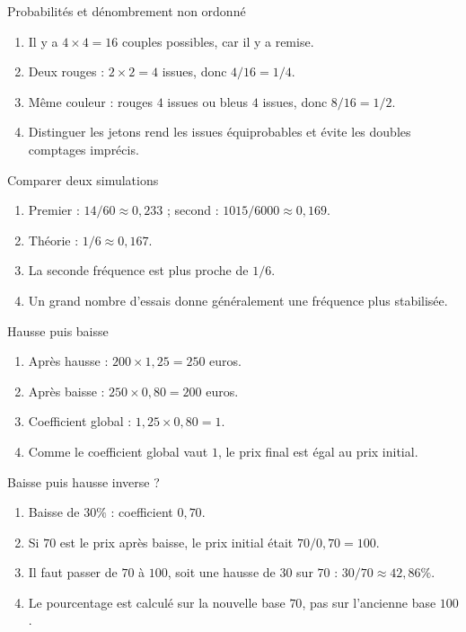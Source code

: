 \documentclass[11pt,a4paper]{article}
\newcounter{corr}
\begin{document}
\begin{corrbox}{Probabilités et dénombrement non ordonné}
\begin{enumerate}
\item Il y a $4\times4=16$ couples possibles, car il y a remise.
\item Deux rouges : $2\times2=4$ issues, donc $4/16=1/4$.
\item Même couleur : rouges $4$ issues ou bleus $4$ issues, donc $8/16=1/2$.
\item Distinguer les jetons rend les issues équiprobables et évite les doubles comptages imprécis.
\end{enumerate}
\end{corrbox}

\begin{corrbox}{Comparer deux simulations}
\begin{enumerate}
\item Premier : $14/60\approx0{,}233$ ; second : $1015/6000\approx0{,}169$.
\item Théorie : $1/6\approx0{,}167$.
\item La seconde fréquence est plus proche de $1/6$.
\item Un grand nombre d'essais donne généralement une fréquence plus stabilisée.
\end{enumerate}
\end{corrbox}

\begin{corrbox}{Hausse puis baisse}
\begin{enumerate}
\item Après hausse : $200\times1{,}25=250$ euros.
\item Après baisse : $250\times0{,}80=200$ euros.
\item Coefficient global : $1{,}25\times0{,}80=1$.
\item Comme le coefficient global vaut $1$, le prix final est égal au prix initial.
\end{enumerate}
\end{corrbox}

\begin{corrbox}{Baisse puis hausse inverse ?}
\begin{enumerate}
\item Baisse de $30\%$ : coefficient $0{,}70$.
\item Si $70$ est le prix après baisse, le prix initial était $70/0{,}70=100$.
\item Il faut passer de $70$ à $100$, soit une hausse de $30$ sur $70$ : $30/70\approx42{,}86\%$.
\item Le pourcentage est calculé sur la nouvelle base $70$, pas sur l'ancienne base $100$.
\end{enumerate}
\end{corrbox}
\end{document}
